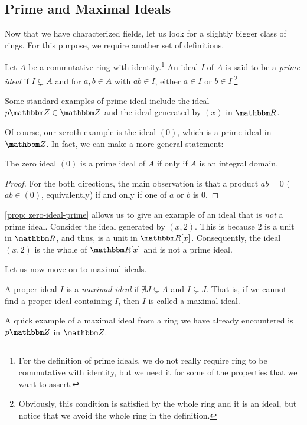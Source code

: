 \subsection{Prime and Maximal Ideals}
Now that we have characterized fields, let us look for a slightly bigger class of rings. For this purpose, we require another set of definitions. 
 \begin{definition}\label{def: prime-ideals}
     Let $A$ be a commutative ring with identity.\footnote{For the definition of prime ideals, we do not really require ring to be commutative with identity, but we need it for some of the properties that we want to assert.} An ideal $I$ of $A$ is said to be a {\it prime ideal} if $I \subsetneq A$ and for $a, b \in A$ with $a b \in I$, either $a \in I$ or $b \in I$.\footnote{Obviously, this condition is satisfied by the whole ring and it is an ideal, but notice that we avoid the whole ring in the definition.}
 \end{definition}
 \begin{example}
     Some standard examples of prime ideal include the ideal $p {\Z} \in {\Z}$ and  the ideal generated by $(x)$ in ${\R}$.
 \end{example}
Of course, our zeroth example is the ideal $(0)$, which is a prime ideal in ${\Z}$. In fact, we can make a more general statement:
\begin{proposition}\label{prop: zero-ideal-prime}
    The zero ideal $(0)$ is a prime ideal of $A$ if only if $A$ is an integral domain. 
\end{proposition}
\begin{proof}
    For the both directions, the main observation is that a product $ab = 0$ ($ab \in (0)$, equivalently) if and only if one of $a$ or $b$ is 0.
\end{proof}
\begin{example}
    \cref{prop: zero-ideal-prime} allows us to give an example of an ideal that is {\it not} a prime ideal. Consider the ideal generated by $(x, 2).$ This is because $2$ is a unit in ${\R}$, and thus, is a unit in ${\R}[x]$. Consequently, the ideal $(x, 2)$ is the whole of ${\R}[x]$ and is not a prime ideal.
\end{example}

Let us now move on to maximal ideals.
\begin{definition}\label{def: maximal}
    A proper ideal $I$ is a {\it maximal ideal} if $\nexists J \subsetneq A$ and $I \subsetneq J$.
    That is, if we cannot find a proper ideal containing $I$, then $I$ is called a maximal ideal.
\end{definition}
\begin{example}
    A quick example of a maximal ideal from a ring we have already encountered is $p {\Z}$ in $\Z$.
\end{example}

